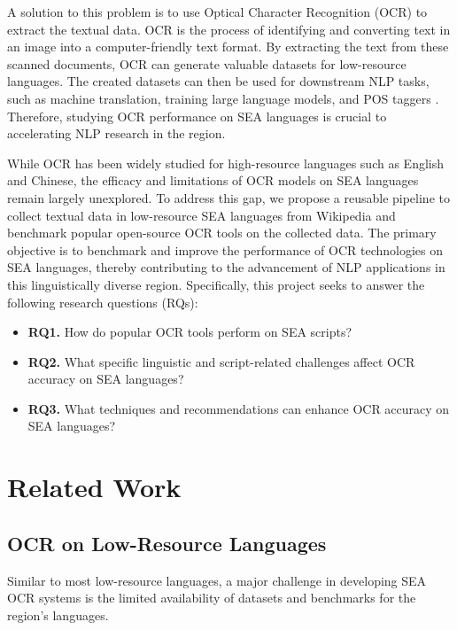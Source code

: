 \documentclass[12pt,oneside]{memoir}
\begin{document}
A solution to this problem is to use Optical Character Recognition (OCR) to extract the textual data.
OCR is the process of identifying and converting text in an image into a computer-friendly text format.
By extracting the text from these scanned documents, OCR can generate valuable datasets for low-resource languages.
The created datasets can then be used for downstream NLP tasks, such as machine translation, training large language models, and POS taggers \parencite{ignat-etal-2022} \parencite{agarwal-and-anastasopoulos-2024}.
Therefore, studying OCR performance on SEA languages is crucial to accelerating NLP research in the region.

While OCR has been widely studied for high-resource languages such as English and Chinese, the efficacy and limitations of OCR models on SEA languages remain largely unexplored.
To address this gap, we propose a reusable pipeline to collect textual data in low-resource SEA languages from Wikipedia and benchmark popular open-source OCR tools on the collected data.
The primary objective is to benchmark and improve the performance of OCR technologies on SEA languages, thereby contributing to the advancement of NLP applications in this linguistically diverse region.
Specifically, this project seeks to answer the following research questions (RQs):

\begin{itemize}
    \item \textbf{RQ1.} How do popular OCR tools perform on SEA scripts?
    \item \textbf{RQ2.} What specific linguistic and script-related challenges affect OCR accuracy on SEA languages?
    \item \textbf{RQ3.} What techniques and recommendations can enhance OCR accuracy on SEA languages?
\end{itemize}

\chapter{Related Work}

\section{OCR on Low-Resource Languages}
Similar to most low-resource languages, a major challenge in developing SEA OCR systems is the limited availability of datasets and benchmarks for the region’s languages.

\parencite{ignat-etal-2022}
\end{document}
